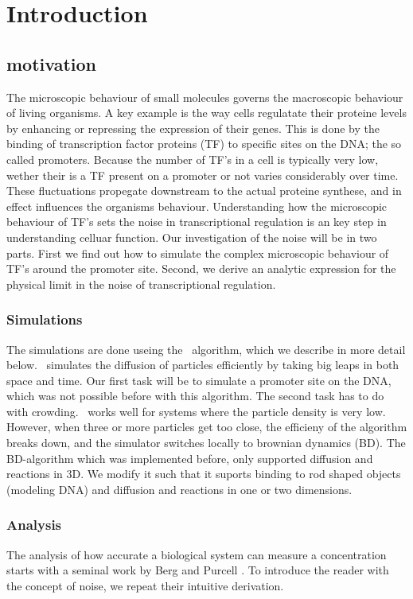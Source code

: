 \section{Introduction}

\subsection{motivation}
The microscopic behaviour of small molecules governs the macroscopic behaviour of living organisms. A key example is the way cells regulatate their proteine levels by enhancing or repressing the expression of their genes. This is done by the binding of transcription factor proteins (TF) to specific sites on the DNA; the so called promoters. Because the number of TF's in a cell is typically very low, wether their is a TF present on a promoter or not varies considerably over time. These fluctuations propegate downstream to the actual proteine synthese, and in effect influences the organisms behaviour. Understanding how the microscopic behaviour of TF's sets the noise in transcriptional regulation is an key step in understanding celluar function. Our investigation of the noise will be in two parts. First we find out how to simulate the complex microscopic behaviour of TF's around the promoter site. Second, we derive an analytic expression for the physical limit in the noise of transcriptional regulation.

\subsubsection{Simulations}
The simulations are done useing the \GFRD\, algorithm, which we describe in more detail below. \GFRD\, simulates the diffusion of particles efficiently by taking big leaps in both space and time. Our first task will be to simulate a promoter site on the DNA, which was not possible before with this algorithm. The second task has to do with crowding. \GFRD\, works well for systems where the particle density is very low. However, when three or more particles get too close, the efficieny of the algorithm breaks down, and the simulator switches locally to brownian dynamics (BD). The BD-algorithm which was implemented before, only supported diffusion and reactions in 3D. We modify it such that it suports binding to rod shaped objects (modeling DNA) and diffusion and reactions in one or two dimensions.

\subsubsection{Analysis}
The analysis of how accurate a biological system can measure a concentration starts with a seminal work by Berg and Purcell \cite{Berg1977}. To introduce the reader with the concept of noise, we repeat their intuitive derivation. 

